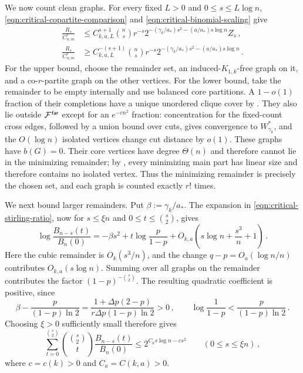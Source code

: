 We now count clean graphs. For every fixed $L>0$ and $0\leq s\leq L\log n$, \eqref{eqn:critical-copartite-comparison} and \eqref{eqn:critical-binomial-scaling} give
\begin{align}
\frac{R_s}{C^r_{n,m}}&\leq C_{k,a,L}^{s+1}\binom ns r^{-s}2^{-(\gamma_k/a_\ast)s^2-(a/a_\ast)s\log n}Z_s\,,\label{eqn:critical-Rs-upper}\\
\frac{R_s}{C^r_{n,m}}&\geq C_{k,a,L}^{-(s+1)}\binom ns r^{-s}2^{-(\gamma_k/a_\ast)s^2-(a/a_\ast)s\log n}\,.\label{eqn:critical-Rs-lower}
\end{align}
For the upper bound, choose the remainder set, an induced-$K_{1,k}$-free graph on it, and a co-$r$-partite graph on the other vertices. For the lower bound, take the remainder to be empty internally and use balanced core partitions. A $1-o(1)$ fraction of their completions have a unique unordered clique cover by . They also lie outside ${\mathcal F}^{\hspace{0.2mm}\mathsf{far}}$ except for an $e^{-cn^2}$ fraction: concentration for the fixed-count cross edges, followed by a union bound over cuts, gives convergence to $W^\ast_{\gamma_k}$, and the $O(\log n)$ isolated vertices change cut distance by $o(1)$. These graphs have $b(G)=0$. Their core vertices have degree $\Theta(n)$ and therefore cannot lie in the minimizing remainder; by , every minimizing main part has linear size and therefore contains no isolated vertex. Thus the minimizing remainder is precisely the chosen set, and each graph is counted exactly $r!$ times.

We next bound larger remainders. Put $\beta:=\gamma_k/a_\ast$. The expansion in \eqref{eqn:critical-stirling-ratio}, now for $s\leq\xi n$ and $0\leq t\leq\binom s2$, gives
$$\log\frac{B_{n-s}(t)}{B_n(0)}=-\beta s^2+t\log\frac{p}{1-p}+O_{k,a}\!\left(s\log n+\frac{s^3}{n}+1\right)\,.$$
Here the cubic remainder is $O_k(s^3/n)$, and the change $q-p=O_a(\log n/n)$ contributes $O_{k,a}(s\log n)$. Summing over all graphs on the remainder contributes the factor $(1-p)^{-\binom s2}$. The resulting quadratic coefficient is positive, since
$$\beta-\frac{p}{(1-p)\ln2}=\frac{1+\Delta p(2-p)}{r\Delta p(1-p)\ln2}>0\,,\qquad \log\frac1{1-p}<\frac{p}{(1-p)\ln2}\,.$$
Choosing $\xi>0$ sufficiently small therefore gives
\begin{equation}\label{eqn:critical-large-s-tail}
\sum_{t=0}^{\binom s2}\binom{\binom s2}{t}\frac{B_{n-s}(t)}{B_n(0)}\leq 2^{C_a s\log n-cs^2}\qquad(0\leq s\leq\xi n)\,,
\end{equation}
where $c=c(k)>0$ and $C_a=C(k,a)>0$.

